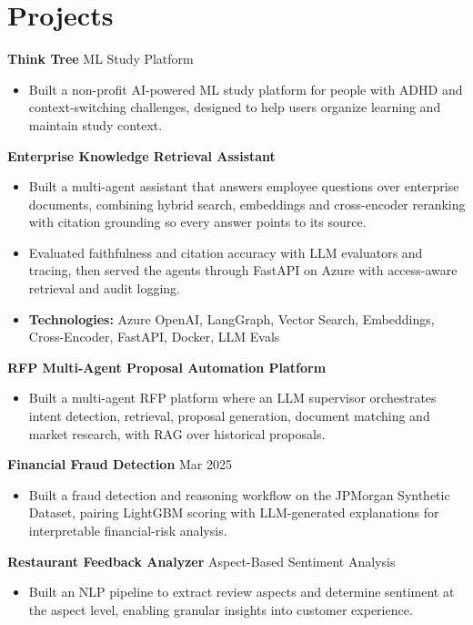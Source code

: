 \documentclass[10pt,a4paper]{article}
\begin{document}
\section{Projects}
\textbf{Think Tree} \textbar{} ML Study Platform\par
\begin{itemize}
  \item Built a non-profit AI-powered ML study platform for people with ADHD and context-switching challenges, designed to help users organize learning and maintain study context.
\end{itemize}
\textbf{Enterprise Knowledge Retrieval Assistant}\par
\begin{itemize}
  \item Built a multi-agent assistant that answers employee questions over enterprise documents, combining hybrid search, embeddings and cross-encoder reranking with citation grounding so every answer points to its source.
  \item Evaluated faithfulness and citation accuracy with LLM evaluators and tracing, then served the agents through FastAPI on Azure with access-aware retrieval and audit logging.
  \item \textbf{Technologies:} Azure OpenAI, LangGraph, Vector Search, Embeddings, Cross-Encoder, FastAPI, Docker, LLM Evals
\end{itemize}
\textbf{RFP Multi-Agent Proposal Automation Platform}\par
\begin{itemize}
  \item Built a multi-agent RFP platform where an LLM supervisor orchestrates intent detection, retrieval, proposal generation, document matching and market research, with RAG over historical proposals.
\end{itemize}
\textbf{Financial Fraud Detection} \textbar{} Mar 2025\par
\begin{itemize}
  \item Built a fraud detection and reasoning workflow on the JPMorgan Synthetic Dataset, pairing LightGBM scoring with LLM-generated explanations for interpretable financial-risk analysis.
\end{itemize}
\textbf{Restaurant Feedback Analyzer} \textbar{} Aspect-Based Sentiment Analysis\par
\begin{itemize}
  \item Built an NLP pipeline to extract review aspects and determine sentiment at the aspect level, enabling granular insights into customer experience.
\end{itemize}
\end{document}
